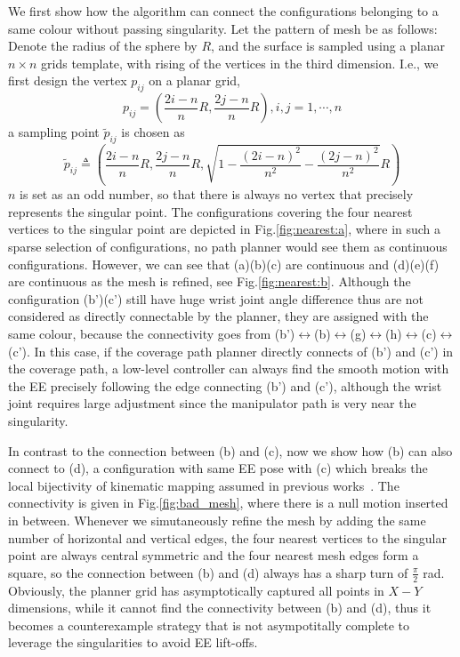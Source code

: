 \documentclass[Afour,sageh,times]{sagej}
\begin{document}
We first show how the algorithm can connect the configurations belonging to a same colour without passing singularity. Let the pattern of mesh be as follows: 
Denote the radius of the sphere by $R$, and the surface is sampled using a planar $n\times n$ grids template, with rising of the vertices in the third dimension. I.e., we first design the vertex $p_{ij}$ on a planar grid, 
\begin{equation}
p_{ij} = \left(\frac{2i-n}{n}R, \frac{2j-n}{n}R\right), i, j = 1, \cdots, n
\end{equation}
a sampling point $\tilde{p}_{ij}$ is chosen as
\begin{equation}
\tilde{p}_{ij} \triangleq \left(\frac{2i-n}{n}R, \frac{2j-n}{n}R, \sqrt{1 - \frac{(2i-n)^2}{n^2} - \frac{(2j-n)^2}{n^2}}R\right)
\end{equation}
$n$ is set as an odd number, so that there is always no vertex that precisely represents the singular point. 
The configurations covering the four nearest vertices to the singular point are depicted in Fig.\ref{fig:nearest:a}, where in such a sparse selection of configurations, no path planner would see them as continuous configurations. However, we can see that (a)(b)(c) are continuous and (d)(e)(f) are continuous as the mesh is refined, see Fig.\ref{fig:nearest:b}. Although the configuration (b')(c') still have huge wrist joint angle difference thus are not considered as directly connectable by the planner, they are assigned with the same colour, because the connectivity goes from (b')$\leftrightarrow$(b)$\leftrightarrow$(g)$\leftrightarrow$(h)$\leftrightarrow$(c)$\leftrightarrow$(c'). 
In this case, if the coverage path planner directly connects of (b') and (c') in the coverage path, a low-level controller can always find the smooth motion with the EE precisely following the edge connecting (b') and (c'), although the wrist joint requires large adjustment since the manipulator path is very near the singularity. 

In contrast to the connection between (b) and (c), now we show how (b) can also connect to (d), a configuration with same EE pose with (c) which breaks the local bijectivity of kinematic mapping assumed in previous works~\cite{Yang2020Cellular}. 
The connectivity is given in Fig.\ref{fig:bad_mesh}, where there is a null motion inserted in between. 
Whenever we simutaneously refine the mesh by adding the same number of horizontal and vertical edges, the four nearest vertices to the singular point are always central symmetric and the four nearest mesh edges form a square, so the connection between (b) and (d) always has a sharp turn of $\frac{\pi}{2}$ rad.  
Obviously, the planner grid has asymptotically captured all points in $X-Y$ dimensions, while it cannot find the connectivity between (b) and (d), thus it becomes a counterexample strategy that is not asympotitally complete to leverage the singularities to avoid EE lift-offs. 
\end{document}
